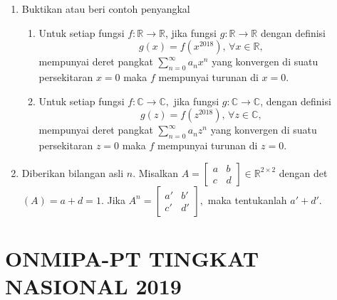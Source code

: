 \documentclass[12pt,twoside]{article}
\begin{document}
\begin{enumerate}
    \item Buktikan atau beri contoh penyangkal
          \begin{enumerate}
              \item Untuk setiap fungsi $f:\mathbb{R}\to\mathbb{R}$, jika fungsi $g:\mathbb{R}\to\mathbb{R}$ dengan definisi
                    \begin{equation*}
                        g(x) = f(x^{2018}), \,\forall x \in \mathbb{R},
                    \end{equation*}
                    mempunyai deret pangkat $\displaystyle\sum_{n=0}^{\infty} a_nx^n$ yang konvergen di suatu persekitaran $x=0$ maka $f$ mempunyai turunan di $x=0$.
              \item Untuk setiap fungsi $f:\mathbb{C}\to\mathbb{C},$ jika fungsi $g : \mathbb{C}\to\mathbb{C}$, dengan definisi
                    \begin{equation*}
                        g(z) = f(z^{2018}),\,\forall z \in \mathbb{C},
                    \end{equation*}
                    mempunyai deret pangkat $\displaystyle\sum_{n=0}^{\infty} a_nz^n$ yang konvergen di suatu persekitaran $z=0$ maka $f$ mempunyai turunan di $z=0$.
          \end{enumerate}


    \item Diberikan bilangan asli $n$. Misalkan $A =\begin{bmatrix}
                  a & b \\ c& d
              \end{bmatrix} \in \mathbb{R}^{2\times2}$ dengan det$(A) = a+d =1$. Jika $A^n = \begin{bmatrix}
                  a' & b' \\ c'&d'
              \end{bmatrix},$ maka tentukanlah $a'+d'$.
\end{enumerate}

\pagebreak

\section{ONMIPA-PT TINGKAT NASIONAL 2019}
\end{document}
